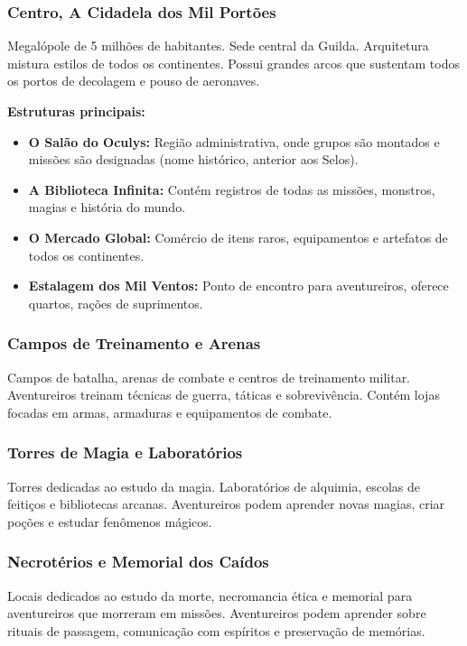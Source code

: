 \subsubsection*{Centro, A Cidadela dos Mil Portões}
Megalópole de 5 milhões de habitantes. Sede central da Guilda. Arquitetura mistura estilos de todos os continentes. Possui grandes arcos que sustentam todos os portos de decolagem e pouso de aeronaves.

\textbf{\ringmfamily Estruturas principais:}
\begin{itemize}
    \item \textbf{O Salão do Oculys:} Região administrativa, onde grupos são montados e missões são designadas (nome histórico, anterior aos Selos).
    \item \textbf{A Biblioteca Infinita:} Contém registros de todas as missões, monstros, magias e história do mundo.
    \item \textbf{O Mercado Global:} Comércio de itens raros, equipamentos e artefatos de todos os continentes.
    \item \textbf{Estalagem dos Mil Ventos:} Ponto de encontro para aventureiros, oferece quartos, rações de suprimentos.
\end{itemize}

\subsubsection*{Campos de Treinamento e Arenas}
Campos de batalha, arenas de combate e centros de treinamento militar. Aventureiros treinam técnicas de guerra, táticas e sobrevivência. Contém lojas focadas em armas, armaduras e equipamentos de combate.

\subsubsection*{Torres de Magia e Laboratórios}
Torres dedicadas ao estudo da magia. Laboratórios de alquimia, escolas de feitiços e bibliotecas arcanas. Aventureiros podem aprender novas magias, criar poções e estudar fenômenos mágicos.

\subsubsection*{Necrotérios e Memorial dos Caídos}
Locais dedicados ao estudo da morte, necromancia ética e memorial para aventureiros que morreram em missões. Aventureiros podem aprender sobre rituais de passagem, comunicação com espíritos e preservação de memórias.

